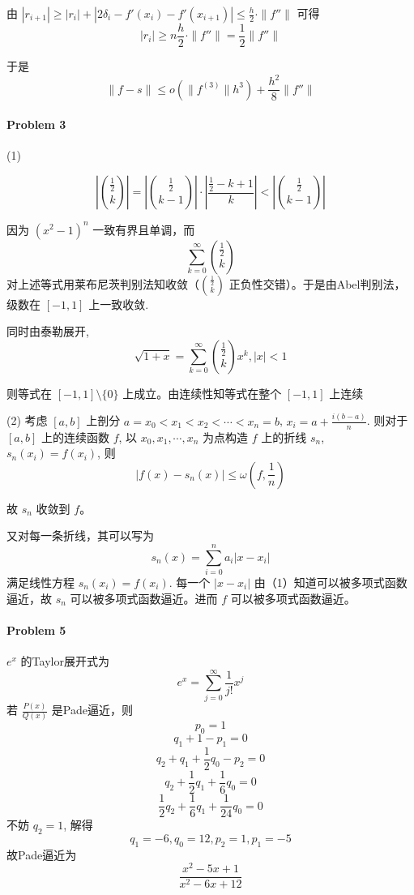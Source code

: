 \documentclass[a4paper]{article}
\theoremstyle{definition}
\theoremstyle{plain}
\newcommand{\<}{\left<}
\renewcommand{\>}{\right>}
\numberwithin{equation}{problem}
\begin{document}
由 $ |r_{i+1}| \geq |r_i|+|2\delta_i-f'(x_i)-f'(x_{i+1})| \leq \frac{h}{2}\cdot\|f''\| $ 可得
\[|r_i| \geq n\frac{h}{2}\cdot\|f''\|=\frac{1}{2}\|f''\|\]

于是
\[\|f-s\| \leq o(\|f^{(3)}\|h^3)+\frac{h^2}{8}\|f''\|\]

\paragraph{Problem 3} 
(1) 

\[\left|\binom{\frac{1}{2}}{k}\right|=\left|\binom{\frac{1}{2}}{k-1}\right|\cdot\left|\frac{\frac{1}{2}-k+1}{k}\right|<\left|\binom{\frac{1}{2}}{k-1}\right|\]

因为 $ (x^2-1)^n $ 一致有界且单调，而
\[\sum_{k=0}^\infty\binom{\frac{1}{2}}{k}\]
对上述等式用莱布尼茨判别法知收敛（$ \binom{\frac{1}{2}}{k} $ 正负性交错）。于是由Abel判别法，级数在 $ [-1,1]$ 上一致收敛.

同时由泰勒展开,
\[\sqrt{1+x}=\sum_{k=0}^\infty\binom{\frac{1}{2}}{k}x^k,|x|<1\]

则等式在 $ [-1,1]\setminus\{0\} $ 上成立。由连续性知等式在整个 $ [-1,1] $ 上连续  

(2) 
考虑 $ [a,b] $ 上剖分 $ a=x_0<x_1<x_2<\cdots<x_n=b $,  $ x_i=a+\frac{i(b-a)}{n} $.
则对于 $ [a,b] $ 上的连续函数 $ f $, 以 $ x_0,x_1,\cdots,x_n $ 为点构造 $ f $ 上的折线 $ s_n $,  $ s_n(x_i)=f(x_i) $, 则
\[|f(x)-s_n(x)| \leq \omega(f,\frac{1}{n})\]

故 $ s_n $ 收敛到 $ f $。

又对每一条折线，其可以写为
\[s_n(x)=\sum_{i=0}^{n}a_i|x-x_i|\]
满足线性方程 $ s_n(x_i)=f(x_i) $. 每一个 $ |x-x_i| $ 由（1）知道可以被多项式函数逼近，故 $ s_n $ 可以被多项式函数逼近。进而 $ f $ 可以被多项式函数逼近。   
\paragraph{Problem 5} $ e^x  $ 的Taylor展开式为
\[e^x=\sum_{j=0}^\infty \frac{1}{j!}x^j\]
若  $ \frac{P(x)}{Q(x)} $ 是Pade逼近，则
\[p_0=1\]
\[q_1+1-p_1=0\]
\[q_2+q_1+\frac{1}{2}q_0-p_2=0\]
\[q_2+\frac{1}{2}q_1+\frac{1}{6}q_0=0\]
\[\frac{1}{2}q_2+\frac{1}{6}q_1+\frac{1}{24}q_0=0\]
不妨 $ q_2=1 $, 解得
\[q_1=-6,q_0=12,p_2=1,p_1=-5\]
故Pade逼近为
\[\frac{x^2-5x+1}{x^2-6x+12}\]
\end{document}
